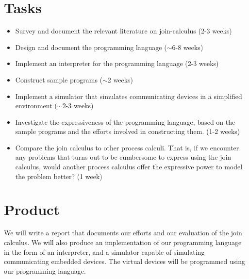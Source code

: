 \documentclass[a4paper, 11pt, oneside, report]{memoir}
\begin{document}
\section*{Tasks}

\begin{itemize}
\item
  Survey and document the relevant literature on join-calculus (2-3 weeks)

\item
  Design and document the programming language (\ensuremath{\sim}6-8
  weeks)

\item
  Implement an interpreter for the programming language (2-3 weeks)

\item
  Construct sample programs (\ensuremath{\sim}2 weeks)

\item
  Implement a simulator that simulates communicating devices in a simplified
  environment (\ensuremath{\sim}2-3 weeks)

\item
  Investigate the expressiveness of the programming language, based on the
  sample programs and the efforts involved in constructing them. (1-2 weeks)

\item
  Compare the join calculus to other process calculi. That is, if we encounter
  any problems that turns out to be cumbersome to express using the join
  calculus, would another process calculus offer the expressive power to
  model the problem better? (1 week)

\end{itemize}
\section*{Product}

We will write a report that documents our efforts and our evaluation of the
join calculus. We will also produce an implementation of our programming
language in the form of an interpreter, and a simulator capable of simulating
communicating embedded devices. The virtual devices will be programmed using
our programming language.



\end{document}
